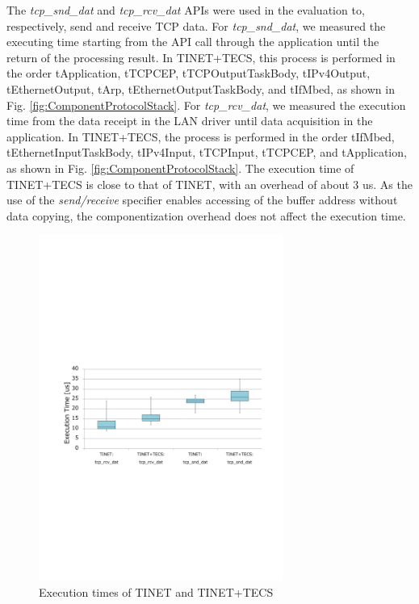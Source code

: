 \documentclass[conference]{IEEEtran/IEEEtran}
\begin{document}
The {\it tcp\_snd\_dat} and {\it tcp\_rcv\_dat} APIs were used in the evaluation to, respectively, send and receive TCP data.
For {\it tcp\_snd\_dat}, we measured the executing time starting from the API call through the application until the return of the processing result.
In TINET+TECS, this process is performed in the order tApplication, tTCPCEP, tTCPOutputTaskBody, tIPv4Output, tEthernetOutput, tArp, tEthernetOutputTaskBody, and tIfMbed, as shown in Fig. \ref{fig:ComponentProtocolStack}.
For {\it tcp\_rcv\_dat}, we measured the execution time from the data receipt in the LAN driver until data acquisition in the application.
In TINET+TECS, the process is performed in the order tIfMbed, tEthernetInputTaskBody, tIPv4Input, tTCPInput, tTCPCEP, and tApplication, as shown in Fig. \ref{fig:ComponentProtocolStack}.
The execution time of TINET+TECS is close to that of TINET, with an overhead of about 3 us.
As the use of the {\it send/receive} specifier enables accessing of the buffer address without data copying, the componentization overhead does not affect the execution time.

\begin{figure}[t]
    \centering
    \includegraphics[width=8.0cm,clip]{figure/EvaluationOfExecutionTime.pdf}
    \vspace{-1mm} \caption{Execution times of TINET and TINET+TECS}
    \vspace{-1mm} \label{fig:EvaluationOfExecutionTime}
\end{figure}
\end{document}
